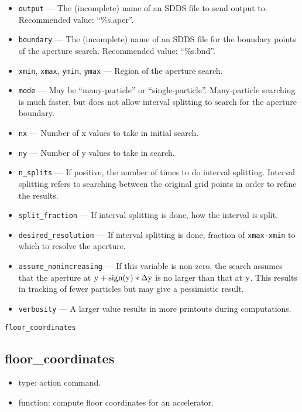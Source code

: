 \documentclass[11pt]{article}
\begin{document}
\begin{itemize}
\item \verb|output| --- The (incomplete) name of an SDDS file to send output to.  
 Recommended value: ``\%s.aper''.
\item \verb|boundary| --- The (incomplete) name of an SDDS 
file for the boundary points of the aperture search.  Recommended value: ``\%s.bnd''.
\item \verb|xmin|, \verb|xmax|, \verb|ymin|, \verb|ymax| --- Region of the aperture search.
\item \verb|mode| --- May be ``many-particle'' or ``single-particle''.  Many-particle searching is
much faster, but does not allow interval splitting to search for the aperture boundary. 
\item \verb|nx| --- Number of x values to take in initial search.
\item \verb|ny| --- Number of y values to take in search.
\item \verb|n_splits| --- If positive, the number of times to do interval splitting.  Interval splitting
refers to searching between the original grid points in order to refine the results.
\item \verb|split_fraction| --- If interval splitting is done, how the interval is split.
\item \verb|desired_resolution| --- If interval splitting is done, fraction of \verb|xmax-xmin| to which to resolve the aperture.
\item \verb|assume_nonincreasing| --- If this variable is non-zero, the search assumes that the aperture
at ${\rm y+sign(y)*\Delta y}$ is no larger than that at ${\rm y}$.  This results in tracking of
fewer particles but may give a pessimistic result.
\item \verb|verbosity| --- A larger value results in more printouts during computations.
\end{itemize}

\begin{latexonly}
\newpage
\begin{center}{\Large\verb|floor_coordinates|}\end{center}
\end{latexonly}
\subsection{floor\_coordinates}

\begin{itemize}
\item type: action command.
\item function: compute floor coordinates for an accelerator.
\end{itemize}
\end{document}
